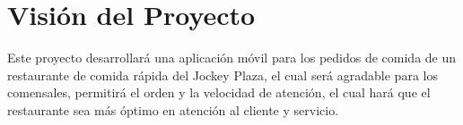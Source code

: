 \chapter{Visión del Proyecto}
Este proyecto desarrollará una aplicación móvil para los pedidos de comida de un restaurante de comida rápida del Jockey Plaza, el cual será agradable para los comensales, permitirá el orden y la velocidad de atención, el cual hará que el restaurante sea más óptimo en atención al cliente y servicio.